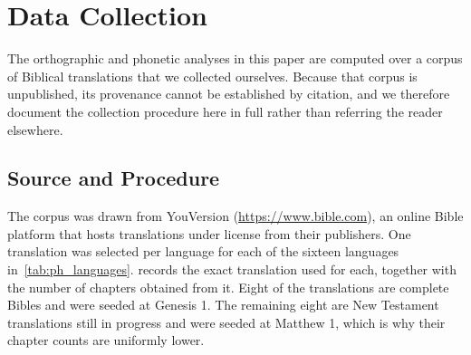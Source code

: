 \section{Data Collection}\label{sec:data_collection}

The orthographic and phonetic analyses in this paper are computed over a corpus
of Biblical translations that we collected ourselves. Because that corpus is
unpublished, its provenance cannot be established by citation, and we therefore
document the collection procedure here in full rather than referring the reader
elsewhere.

\subsection{Source and Procedure}

The corpus was drawn from YouVersion (\url{https://www.bible.com}), an online
Bible platform that hosts translations under license from their publishers. One
translation was selected per language for each of the sixteen languages
in~\cref{tab:ph_languages}.  records the exact translation used
for each, together with the number of chapters obtained from it. Eight of the
translations are complete Bibles and were seeded at Genesis 1. The remaining
eight are New Testament translations still in progress and were seeded at
Matthew 1, which is why their chapter counts are uniformly lower.

